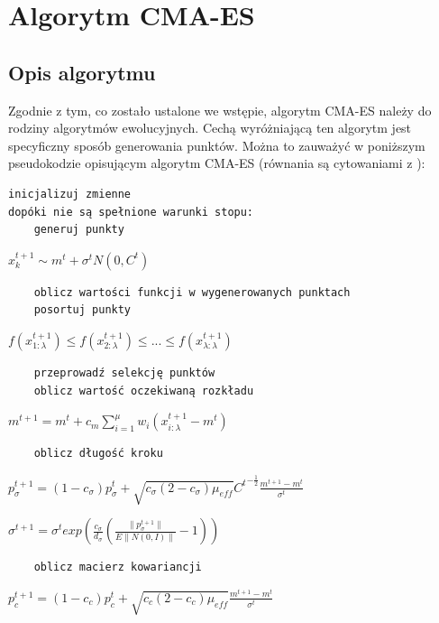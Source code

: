 \documentclass{mini}
\begin{document}
\pagebreak

\section{Algorytm CMA-ES}
\label{secalgcmaes}

\subsection{Opis algorytmu}
Zgodnie z tym, co zostało ustalone we wstępie, algorytm CMA-ES należy do rodziny algorytmów ewolucyjnych. Cechą wyróżniającą ten algorytm jest specyficzny sposób generowania punktów. Można to zauważyć w poniższym pseudokodzie opisującym algorytm CMA-ES (równania są cytowaniami z \cite{cmaes_tutorial}):
\begin{Verbatim}
inicjalizuj zmienne
dopóki nie są spełnione warunki stopu:
	generuj punkty
\end{Verbatim}
\hspace{12ex} $x_k^{t+1} \sim m^t + \sigma^tN(0,C^t)$
\begin{Verbatim}
	oblicz wartości funkcji w wygenerowanych punktach
	posortuj punkty
\end{Verbatim}
\hspace{12ex} $f(x_{1:\lambda}^{t+1}) \leq f(x_{2:\lambda}^{t+1}) \leq ... \leq f(x_{\lambda:\lambda}^{t+1})$
\begin{Verbatim}
	przeprowadź selekcję punktów
	oblicz wartość oczekiwaną rozkładu
\end{Verbatim}
\hspace{12ex} $m^{t+1}=m^t+c_m\sum\limits_{i=1}^\mu w_i(x_{i:\lambda}^{t+1}-m^t)$
\begin{Verbatim}
	oblicz długość kroku
\end{Verbatim}
\hspace{12ex} $p_\sigma^{t+1}=(1-c_\sigma)p_\sigma^t+\sqrt{c_\sigma(2-c_\sigma)\mu_{eff}}{C^t}^{-\frac{1}{2}}\frac{m^{t+1}-m^t}{\sigma^t}$

\hspace{8,5ex} $\sigma^{t+1}=\sigma^t exp (\frac{c_\sigma}{d_\sigma}(\frac{\|p_\sigma^{t+1}\|}{E\|N(0,I)\|}-1))$
\begin{Verbatim}
	oblicz macierz kowariancji
\end{Verbatim}
\hspace{12ex} $p_c^{t+1} = (1-c_c)p_c^t+\sqrt{c_c(2-c_c)\mu_{eff}}\frac{m^{t+1}-m^t}{\sigma^t}$
\end{document}
